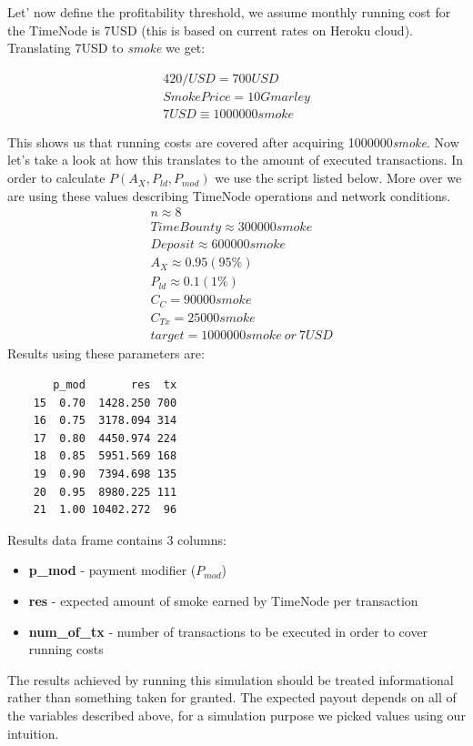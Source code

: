 \documentclass{article}
\begin{document}
  Let' now define the profitability threshold, we assume monthly running cost for the TimeNode is 7USD (this is based on current rates on Heroku cloud). Translating 7USD to \textit{smoke} we get:
  
  \begin{align*}
  420/USD=700USD\\
  Smoke Price = 10Gmarley\\
  7USD \equiv 1000000smoke
  \end{align*}
  
  This shows us that running costs are covered after acquiring 1000000\textit{smoke}. Now let's take a look at how this translates to the amount of executed transactions. In order to calculate $P(A_{X}, P_{ld}, P_{mod})$ we use the script listed below. More over we are using these values describing TimeNode operations and network conditions.
  \begin{align*}
  &n \approx 8\\
  &TimeBounty \approx 300000smoke\\
  &Deposit \approx 600000smoke\\
  &A_{X} \approx 0.95 (95\%)\\
  &P_{ld} \approx 0.1 (1\%)\\
  &C_{C} = 90000smoke\\
  &C_{Tx} = 25000smoke\\
  &target = 1000000smoke~or~7USD
  \end{align*}
  Results using these parameters are:
  \begin{verbatim}
       p_mod       res  tx
    15  0.70  1428.250 700
    16  0.75  3178.094 314
    17  0.80  4450.974 224
    18  0.85  5951.569 168
    19  0.90  7394.698 135
    20  0.95  8980.225 111
    21  1.00 10402.272  96
  \end{verbatim}
  Results data frame contains 3 columns:
  \begin{itemize}
  \item \textbf{p\_mod} - payment modifier ($P_{mod}$)
  \item \textbf{res} - expected amount of smoke earned by TimeNode per transaction
  \item \textbf{num\_of\_tx} - number of transactions to be executed in order to cover running costs
  \end{itemize}
  
  The results achieved by running this simulation should be treated informational rather than something taken for granted. The expected payout depends on all of the variables described above, for a simulation purpose we picked values using our intuition.
  
\end{document}
